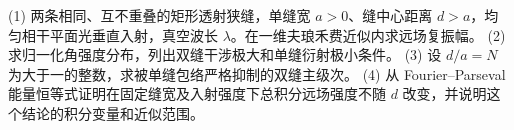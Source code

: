 (1) 两条相同、互不重叠的矩形透射狭缝，单缝宽 \(a>0\)、缝中心距离 \(d>a\)，均匀相干平面光垂直入射，真空波长 \(\lambda\)。在一维夫琅禾费近似内求远场复振幅。
(2) 求归一化角强度分布，列出双缝干涉极大和单缝衍射极小条件。
(3) 设 \(d/a=N\) 为大于一的整数，求被单缝包络严格抑制的双缝主级次。
(4) 从 Fourier–Parseval 能量恒等式证明在固定缝宽及入射强度下总积分远场强度不随 \(d\) 改变，并说明这个结论的积分变量和近似范围。

